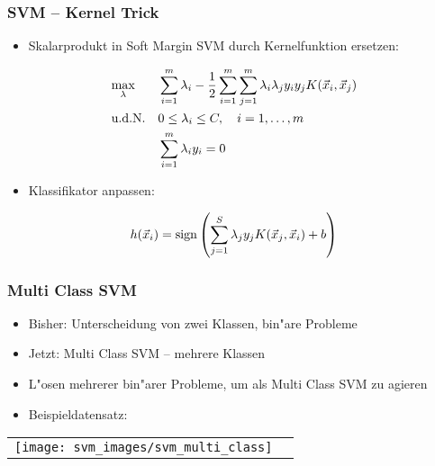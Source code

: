 \begin{frame}

\frametitle{SVM -- Kernel Trick}

\begin{itemize}
	\setlength{\itemsep}{10pt}
	\item Skalarprodukt in Soft Margin SVM durch Kernelfunktion ersetzen:
\end{itemize}

\begin{equation}
	\begin{aligned}
		& \underset{\lambda}{\max} && \sum\limits_{i=1}^m \lambda_i - \frac{1}{2} \sum\limits_{i=1}^m \sum\limits_{j=1}^m \lambda_i \lambda_j y_i y_j K(\vec{x}_i,\vec{x}_j) \notag \\
		& \textrm{u.d.N.}         && 0 \leq \lambda_i \leq C, \quad i=1,\ldots,m \\
		&						  && \sum\limits_{i=1}^m \lambda_i y_i = 0
	\end{aligned}
\end{equation}

\begin{itemize}
	\setlength{\itemsep}{10pt}
	\item Klassifikator anpassen:
\end{itemize}

\begin{equation}
	h(\vec{x}_i) = \mathrm{sign}\left(\sum\limits_{j=1}^S \lambda_j y_j K(\vec{x}_j,\vec{x}_i)+b \right) \notag
\end{equation}

\end{frame}








\begin{frame}

\frametitle{Multi Class SVM}

\begin{itemize}
	\setlength{\itemsep}{7pt}
	\item Bisher: Unterscheidung von zwei Klassen, bin"are Probleme 
	\item Jetzt: Multi Class SVM -- mehrere Klassen
	\item L"osen mehrerer bin"arer Probleme, um als Multi Class SVM zu agieren
	\item Beispieldatensatz:
\end{itemize}

\center
\begin{tabular}[h]{cl}
\texttt{[image: svm\_images/svm\_multi\_class]} &  {\tiny \cite{svmsuccinctly}}
\end{tabular}

\end{frame}






